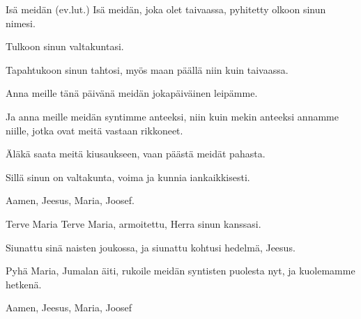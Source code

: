   \vspace{\fill}
  \hardbrk
  \vspace*{1ex} %
  \begin{passage}[FI]{Isä meidän {\scriptsize(ev.lut.)}}
    Isä meidän, joka olet taivaassa,
    pyhitetty olkoon sinun nimesi.
    \par
    Tulkoon sinun valtakuntasi.
    \par
    Tapahtukoon sinun tahtosi,
    myös maan päällä niin kuin taivaassa.
    \par
    Anna meille tänä päivänä
    meidän jokapäiväinen leipämme.
    \par
    Ja anna meille meidän syntimme anteeksi,
    niin kuin mekin anteeksi annamme niille,
    jotka ovat meitä vastaan rikkoneet.
    \par
    Äläkä saata meitä kiusaukseen,
    vaan päästä meidät pahasta.
    \par
    Sillä sinun on valtakunta,
    voima ja kunnia iankaikkisesti.
    \par
    Aamen, Jeesus, Maria, Joosef.
  \end{passage}
  \begin{passage}[FI]{Terve Maria}
    Terve Maria, armoitettu,
    Herra sinun kanssasi.
    \par
    Siunattu sinä naisten joukossa,
    ja siunattu kohtusi hedelmä, Jeesus.
    \par
    Pyhä Maria, Jumalan äiti, rukoile meidän
    syntisten puolesta nyt, ja kuolemamme hetkenä.
    \par
    Aamen, Jeesus, Maria, Joosef
  \end{passage}
  \vspace*{\fill}
\endsong


